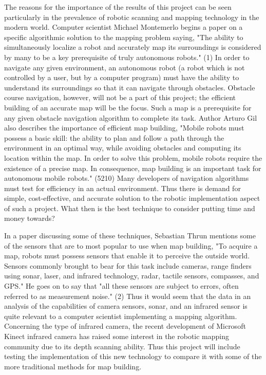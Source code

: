 \documentclass{article}
\begin{document}
	The reasons for the importance of the results of this project
        can be seen particularly in the prevalence of robotic scanning
        and mapping technology in the modern world.  Computer
        scientist Michael Montemerlo begins a paper on a specific
        algorithmic solution to the mapping problem saying, "The
        ability to simultaneously localize a robot and accurately map
        its surroundings is considered by many to be a key
        prerequisite of truly autonomous robots." (1)  In order to
        navigate any given environment, an autonomous robot (a robot
        which is not controlled by a user, but by a computer program)
        must have the ability to understand its surroundings so that
        it can navigate through obstacles.  Obstacle course
        navigation, however, will not be a part of this project; the
        efficient building of an accurate map will be the focus.  Such
        a map is a prerequisite for any given obstacle navigation
        algorithm to complete its task.  Author Arturo Gil also
        describes the importance of efficient map building, "Mobile
        robots must possess a basic skill: the ability to plan and
        follow a path through the environment in an optimal way, while
        avoiding obstacles and computing its location within the map.
        In order to solve this problem, mobile robots require the
        existence of a precise map.  In consequence, map building is
        an important task for autonomous mobile robots." (5210)  Many
        developers of navigation algorithms must test for efficiency
        in an actual environment.  Thus there is demand for simple,
        cost-effective, and accurate solution to the robotic
        implementation aspect of such a project.  What then is the
        best technique to consider putting time and money towards?   

	In a paper discussing some of these techniques, Sebastian
        Thrun mentions some of the sensors that are to most popular to
        use when map building, "To acquire a map, robots must possess
        sensors that enable it to perceive the outside world. Sensors
        commonly brought to bear for this task include cameras, range
        finders using sonar, laser, and infrared technology, radar,
        tactile sensors, compasses, and GPS."  He goes on to say that
        "all these sensors are subject to errors, often referred to as
        measurement noise." (2)  Thus it would seem that the data in
        an analysis of the capabilities of camera sensors, sonar, and
        an infrared sensor is quite relevant to a computer scientist
        implementing a mapping algorithm.  Concerning the type of
        infrared camera, the recent development of Microsoft Kinect
        infrared camera has raised some interest in the robotic
        mapping community due to its depth scanning ability.  Thus
        this project will include testing the implementation of this
        new technology to compare it with some of the more traditional
        methods for map building.  
\end{document}
